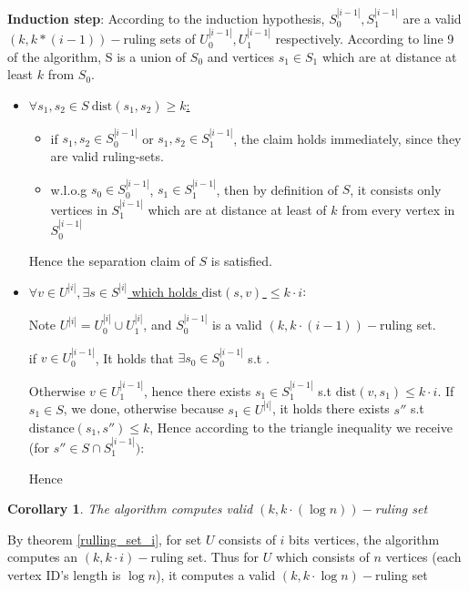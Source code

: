 \documentclass[11pt]{article}
\newtheorem{corollary}{Corollary}[theorem]
\begin{document}
\textbf{Induction step}: According to the induction hypothesis, $S^{|i-1|}_{0}, S^{|i-1|}_{1}$ are a valid $(k, k*(i-1))-$ruling sets of $U^{|i-1|}_{0}, U^{|i-1|}_{1}$ respectively. According to line 9 of the algorithm, S is a union of $S_0$ and vertices $s_1 \in S_1$ which are at distance at least $k$ from $S_0$.
\begin{itemize}
    \item \underline{$\forall s_1, s_2 \in S \: \text{dist}(s_1,s_2) \ge k$:}
        \begin{itemize}
            \item if $s_1, s_2 \in S^{|i-1|}_{0}$ or $s_1, s_2 \in S^{|i-1|}_{1}$, the claim holds immediately, since they are valid ruling-sets.
            \item w.l.o.g $s_0 \in S^{|i-1|}_{0}$, $s_1 \in S^{|i-1|}_{1}$, then by definition of $S$, it consists only vertices in $S^{|i-1|}_{1}$ which are at distance at least of $k$ from every vertex in $S^{|i-1|}_{0}$
        \end{itemize}
    Hence the separation claim of $S$ is satisfied.
    
    \item \underline{$\forall v\in U^{|i|}, \exists s \in S^{|i|}$ which holds $\text{dist}(s,v)$ $\le k \cdot i$}:
    
    Note $U^{|i|}=U^{|i|}_0 \cup U^{|i|}_1$, and $S^{|i-1|}_0$ is a valid $(k, k\cdot(i-1))-$ruling set.
    
    if $v \in U^{|i-1|}_0$, It holds that $\exists s_0 \in S^{|i-1|}_0$
    s.t .
    
    Otherwise $v \in  U^{|i-1|}_1$, hence there exists $s_1 \in S^{|i-1|}_1$ s.t $\text{dist}(v, s_1) \le k \cdot i$.
    If $s_1 \in S$, we done, otherwise because $s_1 \in U^{|i|}$, it holds there exists $s''$ s.t $\text{distance}(s_1, s'') \le k$, Hence according to the triangle inequality we receive (for $s'' \in S \cap S^{|i-1|}_{1})$: 
    
    
    Hence 
    
\end{itemize}

\begin{corollary}
\label{rulling_set_logn}
The algorithm computes valid  $(k, k\cdot(\log{n}))-$ruling set
\end{corollary}
By theorem \ref{rulling_set_i}, for set $U$ consists of $i$ bits vertices, the algorithm computes an $(k, k \cdot i)-$ruling set. Thus for $U$ which consists of $n$ vertices (each vertex ID's length is $\log{n}$), it computes a valid $(k, k \cdot \log{n})-$ruling set
\end{document}
